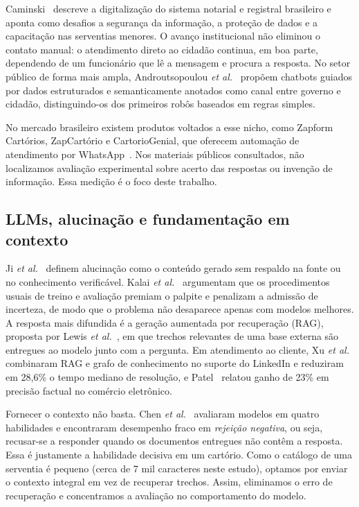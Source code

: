 \documentclass[conference]{IEEEtran}
\begin{document}
Caminski~\cite{caminski2025} descreve a digitalização do sistema notarial e registral brasileiro e aponta como desafios a segurança da informação, a proteção de dados e a capacitação nas serventias menores. O avanço institucional não eliminou o contato manual: o atendimento direto ao cidadão continua, em boa parte, dependendo de um funcionário que lê a mensagem e procura a resposta. No setor público de forma mais ampla, Androutsopoulou \emph{et al.}~\cite{androutsopoulou2019} propõem chatbots guiados por dados estruturados e semanticamente anotados como canal entre governo e cidadão, distinguindo-os dos primeiros robôs baseados em regras simples.

No mercado brasileiro existem produtos voltados a esse nicho, como Zapform Cartórios, ZapCartório e CartorioGenial, que oferecem automação de atendimento por WhatsApp~\cite{zapcartorios,zapcartorio,cartoriogenial}. Nos materiais públicos consultados, não localizamos avaliação experimental sobre acerto das respostas ou invenção de informação. Essa medição é o foco deste trabalho.

\subsection{LLMs, alucinação e fundamentação em contexto}

Ji \emph{et al.}~\cite{ji2023} definem alucinação como o conteúdo gerado sem respaldo na fonte ou no conhecimento verificável. Kalai \emph{et al.}~\cite{kalai2025} argumentam que os procedimentos usuais de treino e avaliação premiam o palpite e penalizam a admissão de incerteza, de modo que o problema não desaparece apenas com modelos melhores. A resposta mais difundida é a geração aumentada por recuperação (RAG), proposta por Lewis \emph{et al.}~\cite{lewis2020}, em que trechos relevantes de uma base externa são entregues ao modelo junto com a pergunta. Em atendimento ao cliente, Xu \emph{et al.}~\cite{xu2024} combinaram RAG e grafo de conhecimento no suporte do LinkedIn e reduziram em 28,6\% o tempo mediano de resolução, e Patel~\cite{patel2025} relatou ganho de 23\% em precisão factual no comércio eletrônico.

Fornecer o contexto não basta. Chen \emph{et al.}~\cite{chen2024rag} avaliaram modelos em quatro habilidades e encontraram desempenho fraco em \emph{rejeição negativa}, ou seja, recusar-se a responder quando os documentos entregues não contêm a resposta. Essa é justamente a habilidade decisiva em um cartório. Como o catálogo de uma serventia é pequeno (cerca de 7 mil caracteres neste estudo), optamos por enviar o contexto integral em vez de recuperar trechos. Assim, eliminamos o erro de recuperação e concentramos a avaliação no comportamento do modelo.
\end{document}
